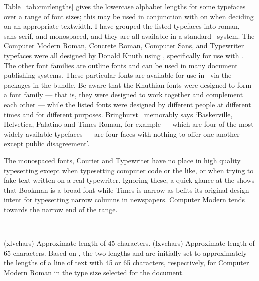 Table~\ref{tab:cmrlengths} gives the lowercase 
alphabet lengths for 
some typefaces over a range of font sizes; this may be used in conjunction
with  on  when deciding
on an appropriate textwidth. I have grouped the 
listed typefaces into roman, sans-serif, and monospaced, and they are 
all available in a standard \ltx\ system. The 
Computer Modern Roman,
Concrete Roman,
Computer Sans,
and Typewriter
typefaces were all designed by Donald Knuth 
using 
\metafont, specifically for use with \tx. The other font families are
\pscript{} outline fonts and can be used in many document publishing systems.
These particular fonts are available for use in \ltx\ via the packages
in the 
bundle. Be aware that the Knuthian fonts were designed to form a 
font family --- 
that is, they were designed to work together and complement each other --- 
while the listed \pscript{}
fonts were designed by different people at different 
times and for different purposes. Bringhurst~\cite[p. 96]{BRINGHURST99}
memorably says `Baskerville, 
Helvetica, 
Palatino and 
Times Roman, 
for example --- which are four of the most widely available 
typefaces --- are four faces with nothing to offer one another except
public disagreement'.


    The monospaced fonts, 
Courier and Typewriter
have no place in high quality typesetting except when typesetting computer
code or the like, or when trying to fake text written on a real typewriter.
Ignoring these, a quick glance at the \tablerefname{} shows that 
Bookman is a broad font while 
Times is narrow as befits its original 
design intent for typesetting narrow columns in newspapers. 
Computer Modern
tends towards the narrow end of the range.


\begin{syntax}
\lnc{\xlvchars} \lnc{\lxvchars} \\
\end{syntax}
\glossary(xlvchars)%
  {}%
  {Approximate length of 45 characters.}
\glossary(lxvchars)%
  {}%
  {Approximate length of 65 characters.}
Based on , the two lengths 
\lnc{\xlvchars} and 
\lnc{\lxvchars} are initially set to approximately the lengths of a 
line of text with
45 or 
65 characters, respectively, for  
Computer Modern Roman in the type size selected for the document.

